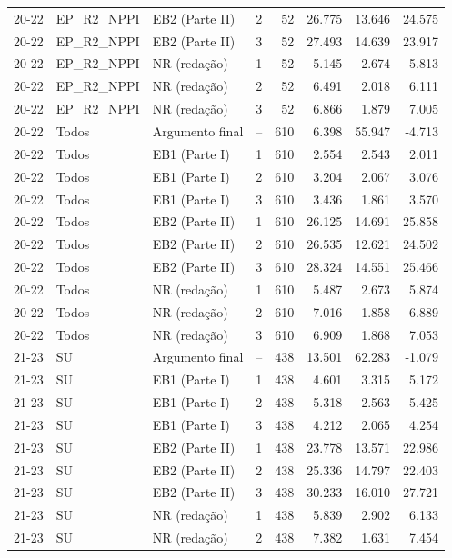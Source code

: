 \begin{longtable}{lllcrrrr}
20-22 & EP\_R2\_NPPI & EB2 (Parte II) & 2 & 52 & 26.775 & 13.646 & 24.575 \\
20-22 & EP\_R2\_NPPI & EB2 (Parte II) & 3 & 52 & 27.493 & 14.639 & 23.917 \\
20-22 & EP\_R2\_NPPI & NR (redação) & 1 & 52 & 5.145 & 2.674 & 5.813 \\
20-22 & EP\_R2\_NPPI & NR (redação) & 2 & 52 & 6.491 & 2.018 & 6.111 \\
20-22 & EP\_R2\_NPPI & NR (redação) & 3 & 52 & 6.866 & 1.879 & 7.005 \\
20-22 & Todos & Argumento final & -- & 610 & 6.398 & 55.947 & -4.713 \\
20-22 & Todos & EB1 (Parte I) & 1 & 610 & 2.554 & 2.543 & 2.011 \\
20-22 & Todos & EB1 (Parte I) & 2 & 610 & 3.204 & 2.067 & 3.076 \\
20-22 & Todos & EB1 (Parte I) & 3 & 610 & 3.436 & 1.861 & 3.570 \\
20-22 & Todos & EB2 (Parte II) & 1 & 610 & 26.125 & 14.691 & 25.858 \\
20-22 & Todos & EB2 (Parte II) & 2 & 610 & 26.535 & 12.621 & 24.502 \\
20-22 & Todos & EB2 (Parte II) & 3 & 610 & 28.324 & 14.551 & 25.466 \\
20-22 & Todos & NR (redação) & 1 & 610 & 5.487 & 2.673 & 5.874 \\
20-22 & Todos & NR (redação) & 2 & 610 & 7.016 & 1.858 & 6.889 \\
20-22 & Todos & NR (redação) & 3 & 610 & 6.909 & 1.868 & 7.053 \\
\midrule
21-23 & SU & Argumento final & -- & 438 & 13.501 & 62.283 & -1.079 \\
21-23 & SU & EB1 (Parte I) & 1 & 438 & 4.601 & 3.315 & 5.172 \\
21-23 & SU & EB1 (Parte I) & 2 & 438 & 5.318 & 2.563 & 5.425 \\
21-23 & SU & EB1 (Parte I) & 3 & 438 & 4.212 & 2.065 & 4.254 \\
21-23 & SU & EB2 (Parte II) & 1 & 438 & 23.778 & 13.571 & 22.986 \\
21-23 & SU & EB2 (Parte II) & 2 & 438 & 25.336 & 14.797 & 22.403 \\
21-23 & SU & EB2 (Parte II) & 3 & 438 & 30.233 & 16.010 & 27.721 \\
21-23 & SU & NR (redação) & 1 & 438 & 5.839 & 2.902 & 6.133 \\
21-23 & SU & NR (redação) & 2 & 438 & 7.382 & 1.631 & 7.454 \\

\end{longtable}
